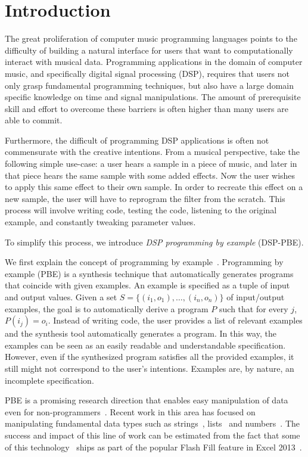 \section{Introduction}

The great proliferation of computer music programming languages points to the difficulty of building a natural interface for users that want to computationally interact with musical data.
Programming applications in the domain of computer music, and specifically digital signal processing (DSP), requires that users not only grasp fundamental programming techniques, but also have a large domain specific knowledge on time and signal manipulations.
The amount of prerequisite skill and effort to overcome these barriers is often higher than many users are able to commit.

Furthermore, the difficult of programming DSP applications is often not commensurate with the creative intentions.
From a musical perspective, take the following simple use-case: a user hears a sample in a piece of music, and later in that piece hears the same sample with some added effects.
Now the user wishes to apply this same effect to their own sample.
In order to recreate this effect on a new sample, the user will have to reprogram the filter from the scratch.
This process will involve writing code, testing the code, listening to the original example, and constantly tweaking parameter values.

To simplify this process, we introduce \textit{DSP programming by example} (DSP-PBE).

We first explain the concept of programming by example~\cite{cypher93,lieberman01,synasc12}.
Programming by example (PBE) is a synthesis technique that automatically generates programs that coincide with given examples. An example is specified as a tuple of input and output values. Given a set $S= \{(i_1, o_1),\ldots, (i_n, o_n)\}$ of input/output examples, the goal is to automatically derive a program $P$ such that for every $j$, $P(i_j) = o_i$. 
Instead of writing code, the user provides a list of relevant examples and the synthesis tool automatically generates a program. In this way, the examples can be seen as an easily readable and understandable specification. However, even if the synthesized program satisfies all the provided examples, it still might not correspond to the user's intentions. Examples are, by nature, an incomplete specification.


PBE is a promising research direction that enables easy manipulation of data even for non-programmers~\cite{GulwaniHS12}. Recent work in this area has focused on manipulating fundamental data types such as strings~\cite{vldb12,icml13}, lists~\cite{FeserCD15,poseraZ15} and numbers~\cite{cav12}. The success and impact of this line of work can be estimated from the fact that some of this technology~\cite{flashFillPOPL} ships as part of the popular Flash Fill feature in Excel 2013~\cite{flashfill}.



